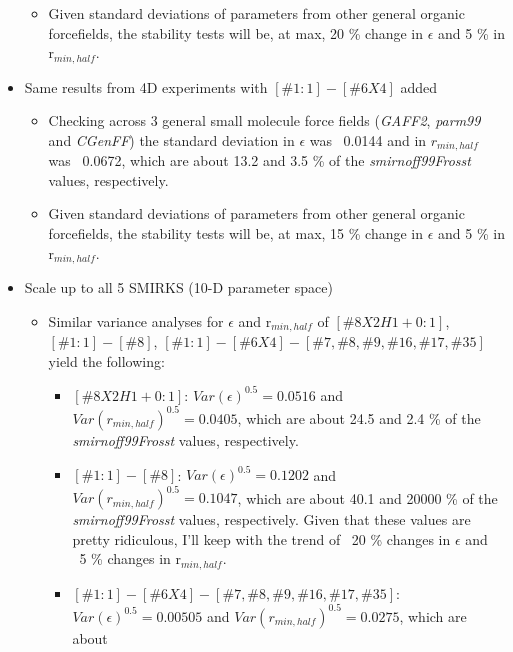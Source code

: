 \documentclass[aps,pre,nofootinbib,superscriptaddress,linenumbers,10pt, draft,tightenlines]{revtex4-1}
\begin{document}
\begin{itemize}
\begin{itemize}
            \item Given standard deviations of parameters from other general organic forcefields,
                  the stability tests will be, at max, 20 \% change in $\epsilon$ and 5 \% 
                  in r$_{min,half}$.
        \end{itemize}        
        \item Same results from 4D experiments with $[\#1:1]-[\#6X4]$ added
        \begin{itemize}
            \item Checking across 3 general small molecule force fields (\textit{GAFF2},
                  \textit{parm99} and \textit{CGenFF}) the standard deviation in $\epsilon$ 
                  was ~0.0144 and in $r_{min,half}$ was ~0.0672, which are about 13.2 and 3.5
                  \% of the \textit{smirnoff99Frosst} values, respectively. 
            \item Given standard deviations of parameters from other general organic 
                  forcefields, the stability tests will be, at max, 15 \% change in 
                  $\epsilon$ and 5 \% in r$_{min,half}$.
        \end{itemize}
        \item Scale up to all 5 SMIRKS (10-D parameter space)
        \begin{itemize}
            \item Similar variance analyses for $\epsilon$ and r$_{min,half}$ of 
                  $[\#8X2H1+0:1]$, $[\#1:1]-[\#8]$, 
                  $[\#1:1]-[\#6X4]-[\#7,\#8,\#9,\#16,\#17,\#35]$ yield the following:
            \begin{itemize}
                \item $[\#8X2H1+0:1]$: $Var\left(\epsilon\right)^{0.5} = 0.0516$ and 
                      $Var\left(r_{min,half}\right)^{0.5} = 0.0405$, which are about 
                      24.5 and 2.4 \% of the \textit{smirnoff99Frosst} values, respectively.
                \item $[\#1:1]-[\#8]$: $Var\left(\epsilon\right)^{0.5} = 0.1202$ and 
                      $Var\left(r_{min,half}\right)^{0.5} = 0.1047$, which are about 
                      40.1 and 20000 \% of the \textit{smirnoff99Frosst} values, respectively.
                      Given that these values are pretty ridiculous, I'll keep with the trend
                      of ~20 \% changes in $\epsilon$ and ~5 \% changes in r$_{min,half}$.
                \item $[\#1:1]-[\#6X4]-[\#7,\#8,\#9,\#16,\#17,\#35]$:                                                   $Var\left(\epsilon\right)^{0.5} = 0.00505$ and                                                   $Var\left(r_{min,half}\right)^{0.5} = 0.0275$, which are about 

\end{itemize}
\end{itemize}
\end{itemize}
\end{document}
